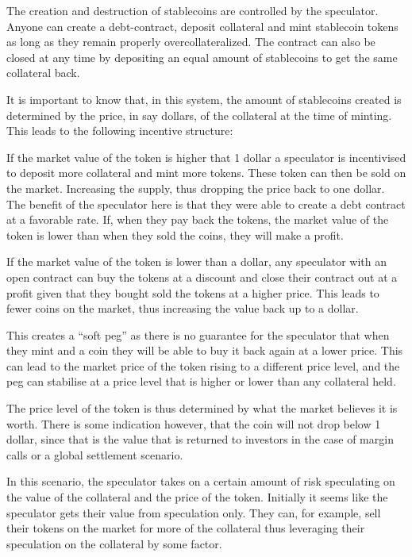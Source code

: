 \documentclass[english,]{IEEEtran}
\begin{document}
The creation and destruction of stablecoins are controlled by the
speculator. Anyone can create a debt-contract, deposit collateral and
mint stablecoin tokens as long as they remain properly
overcollateralized. The contract can also be closed at any time by
depositing an equal amount of stablecoins to get the same collateral
back.

It is important to know that, in this system, the amount of stablecoins
created is determined by the price, in say dollars, of the collateral at
the time of minting. This leads to the following incentive structure:

If the market value of the token is higher that 1 dollar a speculator is
incentivised to deposit more collateral and mint more tokens. These
token can then be sold on the market. Increasing the supply, thus
dropping the price back to one dollar. The benefit of the speculator
here is that they were able to create a debt contract at a favorable
rate. If, when they pay back the tokens, the market value of the token
is lower than when they sold the coins, they will make a profit.

If the market value of the token is lower than a dollar, any speculator
with an open contract can buy the tokens at a discount and close their
contract out at a profit given that they bought sold the tokens at a
higher price. This leads to fewer coins on the market, thus increasing
the value back up to a dollar.

This creates a ``soft peg'' as there is no guarantee for the speculator
that when they mint and a coin they will be able to buy it back again at
a lower price. This can lead to the market price of the token rising to
a different price level, and the peg can stabilise at a price level that
is higher or lower than any collateral held.

The price level of the token is thus determined by what the market
believes it is worth. There is some indication however, that the coin
will not drop below 1 dollar, since that is the value that is returned
to investors in the case of margin calls or a global settlement
scenario.

In this scenario, the speculator takes on a certain amount of risk
speculating on the value of the collateral and the price of the token.
Initially it seems like the speculator gets their value from speculation
only. They can, for example, sell their tokens on the market for more of
the collateral thus leveraging their speculation on the collateral by
some factor.
\end{document}
